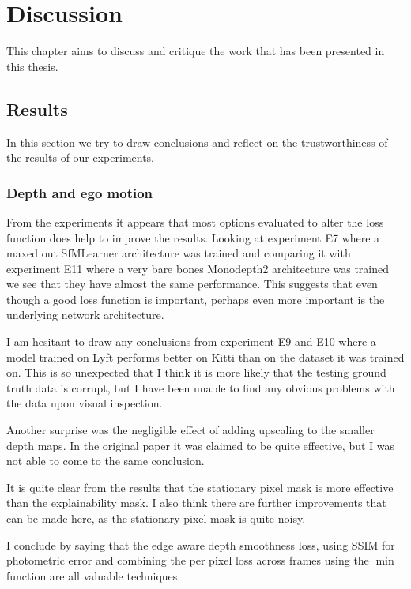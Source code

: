 \chapter{Discussion}\label{cha:discussion}

This chapter aims to discuss and critique the work that has been presented in this thesis. 

\section{Results}

In this section we try to draw conclusions and reflect on the trustworthiness of the results of our experiments.

\subsection{Depth and ego motion}

From the experiments it appears that most options evaluated to alter the loss function does help to improve the results. Looking at experiment E7 where a maxed out SfMLearner architecture was trained and comparing it with experiment E11 where a very bare bones Monodepth2 architecture was trained we see that they have almost the same performance. This suggests that even though a good loss function is important, perhaps even more important is the underlying network architecture.

I am hesitant to draw any conclusions from experiment E9 and E10 where a model trained on Lyft performs better on Kitti than on the dataset it was trained on. This is so unexpected that I think it is more likely that the testing ground truth data is corrupt, but I have been unable to find any obvious problems with the data upon visual inspection.

Another surprise was the negligible effect of adding upscaling to the smaller depth maps. In the original paper it was claimed to be quite effective, but I was not able to come to the same conclusion.

It is quite clear from the results that the stationary pixel mask is more effective than the explainability mask. I also think there are further improvements that can be made here, as the stationary pixel mask is quite noisy.

I conclude by saying that the edge aware depth smoothness loss, using SSIM for photometric error and combining the per pixel loss across frames using the $\min$ function are all valuable techniques.

